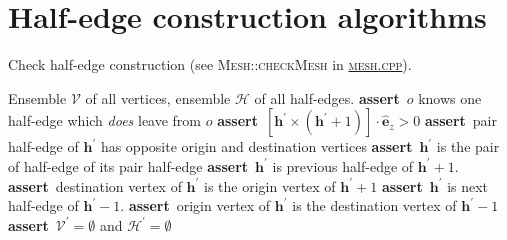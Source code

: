 \documentclass[aps, superscriptaddress, notitlepage]{revtex4-1}
\providecommand\ASSERT{\STATE\textbf{assert}~}
\begin{document}


\appendix

\newpage
\section{Half-edge construction algorithms}

\begin{algorithm}[H]
\caption{Check half-edge construction (see \textsc{Mesh::checkMesh} in \href{../mesh.cpp}{\textsc{mesh.cpp}}).}
\label{alg:check}
\begin{algorithmic}[1]
\REQUIRE Ensemble $\mathcal{V}$ of all vertices, ensemble $\mathcal{H}$ of all half-edges.
     
    \ENDIF
     
     
         
            \ASSERT $o$ knows one half-edge which \textit{does} leave from $o$
        \ENDIF
        \ASSERT $[\boldsymbol{h}^{\prime} \times (\boldsymbol{h}^{\prime} + 1)] \cdot \hat{\boldsymbol{e}}_z > 0$ 
        \ASSERT pair half-edge of $\boldsymbol{h}^{\prime}$ has opposite origin and destination vertices 
        \ASSERT $\boldsymbol{h}^{\prime}$ is the pair of half-edge of its pair half-edge
        \ASSERT $\boldsymbol{h}^{\prime}$ is previous half-edge of $\boldsymbol{h}^{\prime} + 1$. 
        \ASSERT destination vertex of $\boldsymbol{h}^{\prime}$ is the origin vertex of $\boldsymbol{h}^{\prime} + 1$
        \ASSERT $\boldsymbol{h}^{\prime}$ is next half-edge of $\boldsymbol{h}^{\prime} - 1$. 
        \ASSERT origin vertex of $\boldsymbol{h}^{\prime}$ is the destination vertex of $\boldsymbol{h}^{\prime} - 1$
    \ENDFOR
\ENDFOR
\ASSERT $\mathcal{V}^{\prime} = \emptyset$ and $\mathcal{H}^{\prime} = \emptyset$
\end{algorithmic}
\end{algorithm}
\end{document}
